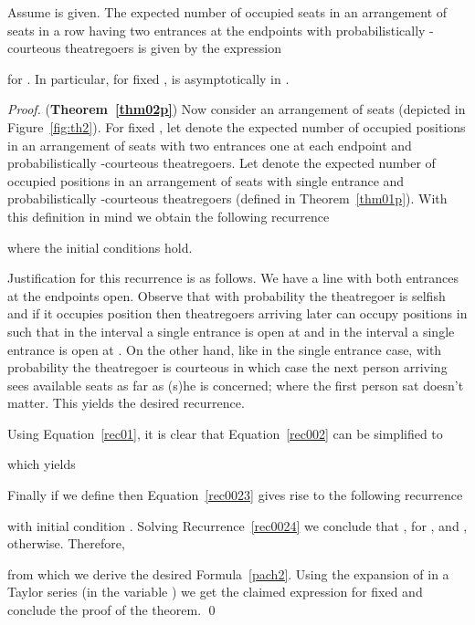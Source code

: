 \documentclass[11pt]{llncs}
\begin{document}
\begin{theorem}
\label{thm02p}
Assume  is given.
The
expected number  of occupied seats in an arrangement of  seats
in a row having two entrances at the endpoints
with probabilistically -courteous
theatregoers is given by the expression

for . In particular, for fixed ,  is 
asymptotically in .
\end{theorem}


\begin{proof} ({\bf Theorem~\ref{thm02p}})
Now consider an arrangement of  seats
(depicted in Figure~\ref{fig:th2}).
For fixed ,
let  denote the expected number of occupied
positions  in an arrangement of  seats
with two entrances one at each endpoint 
and probabilistically -courteous
theatregoers.
Let  denote the expected number of occupied
positions  in an arrangement of  seats
with single entrance 
and probabilistically -courteous
theatregoers (defined in Theorem~\ref{thm01p}).
With this definition in mind we obtain the following
recurrence

where the initial conditions  hold.

Justification for this recurrence is as follows.
We have a line
with both entrances at the endpoints open. 
Observe that with probability 
the theatregoer is selfish and if it occupies
position  then theatregoers arriving later
can occupy positions in 
such that in the interval 
a single entrance is open at  and 
in the interval  a single
entrance is open at .
On the
other hand, like in the single entrance case,
with probability  the theatregoer is courteous in which case the next person
arriving sees  
available seats as far as (s)he is concerned; where the first
person sat doesn't matter.
This yields the desired recurrence.

Using Equation~\eqref{rec01},
it is clear that Equation~\eqref{rec002} can be simplified to

which yields


Finally if we define  then Equation~\eqref{rec0023} 
gives rise to the following recurrence

with initial condition .
Solving Recurrence~\eqref{rec0024} we conclude that
, for , and ,
otherwise. Therefore,

from which we derive the desired Formula~\eqref{pach2}. 
Using the expansion of  in a Taylor series (in the variable )
we get the claimed expression for fixed 
and conclude the proof
of the theorem.
\qed
\end{proof}
\end{document}
